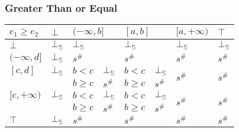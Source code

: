 \documentclass[aspectratio=169]{beamer}
\begin{document}
        \begin{frame}
            \frametitle{Greater Than or Equal}
        \begin{table}
            \begin{tabular}{|l|l|ll|ll|l|l|}
            \hline
            $e_1 \ge e_2$  & $\bot$ & \multicolumn{2}{l|}{$(-\infty, b]$} & \multicolumn{2}{l|}{$[a, b]$} & $[a, +\infty)$          & $\top$                  \\ \hline
            $\bot$         & $\bot_\mathbb{S}$ & \multicolumn{2}{l|}{$\bot_\mathbb{S}$}         & \multicolumn{2}{l|}{$\bot_\mathbb{S}$}   & $\bot_\mathbb{S}$                  & $\bot_\mathbb{S}$                  \\ \hline
            $(-\infty, d]$ & $\bot_\mathbb{S}$ & \multicolumn{2}{l|}{$s^\#$}         & \multicolumn{2}{l|}{$s^\#$}   & $s^\#$                  & $s^\#$                  \\ \hline
            $[c, d]$       & $\bot_\mathbb{S}$ & $b < c$            & $\bot_\mathbb{S}$         & $b < c$         & $\bot_\mathbb{S}$      & \multirow{2}{*}{$s^\#$} & \multirow{2}{*}{$s^\#$} \\
                            &        & $b \ge c$          & $s^\#$         & $b \ge c$       & $s^\#$      &                         &                         \\ \hline
            $[c, +\infty)$ & $\bot_\mathbb{S}$ & $b < c$            & $\bot_\mathbb{S}$         & $b < c$         & $\bot_\mathbb{S}$      & \multirow{2}{*}{$s^\#$} & \multirow{2}{*}{$s^\#$} \\
                            &        & $b \ge c$          & $s^\#$         & $b \ge c$       & $s^\#$      &                         &                         \\ \hline
            $\top$         & $\bot_\mathbb{S}$ & \multicolumn{2}{l|}{$s^\#$}         & \multicolumn{2}{l|}{$s^\#$}   & $s^\#$                  & $s^\#$                  \\ \hline
            \end{tabular}
            \end{table}
        \end{frame}
\end{document}
